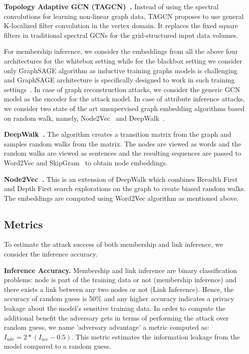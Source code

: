 \noindent\textbf{Topology Adaptive GCN (TAGCN)~\cite{du2018topology}.} Instead of using the spectral convolutions for learning non-linear graph data, TAGCN proposes to use general K-localized filter convolution in the vertex domain.
It replaces the fixed square filters in traditional spectral GCNs for the grid-structured input data volumes.



\noindent For membership inference, we consider the embeddings from all the above four architectures for the whitebox setting while for the blackbox setting we consider only GraphSAGE algorithm as inductive training graphs models is challenging and GraphSAGE architecture is specifically designed to work in such training settings~\cite{NIPS20176703}.
In case of graph reconstruction attacks, we consider the generic GCN model as the encoder for the attack model.
In case of attribute inference attacks, we consider two state of the art unsupervised graph embedding algorithms based on random walk, namely, Node2Vec~\cite{node2vec} and DeepWalk~\cite{deepwalk}.

\noindent\textbf{DeepWalk~\cite{deepwalk}.} The algorithm creates a transition matrix from the graph and samples random walks from the matrix.
The nodes are viewed as words and the random walks are viewed as sentences and the resulting sequences are passed to Word2Vec and SkipGram~\cite{wordemb} to obtain node embeddings.

\noindent\textbf{Node2Vec~\cite{node2vec}.} This is an extension of DeepWalk which combines Breadth First and Depth First search explorations on the graph to create biased random walks.
The embeddings are computed using Word2Vec algorithm as mentioned above.







\subsection{Metrics}


\noindent To estimate the attack success of both membership and link inference, we consider the inference accuracy.

\noindent\textbf{Inference Accuracy.} Membership and link inference are binary classification problems: node is part of the training data or not (membership inference) and there exists a link between any two nodes or not (Link Inference).
Hence, the accuracy of random guess is 50\% and any higher accuracy indicates a privacy leakage about the model's sensitive training data.
In order to compute the additional benefit the adversary gets in terms of performing the attack over random guess, we name 'adversary advantage' a metric computed as: $I_{adv} = 2*(I_{acc}-0.5)$.
This metric estimates the information leakage from the model compared to a random guess.


